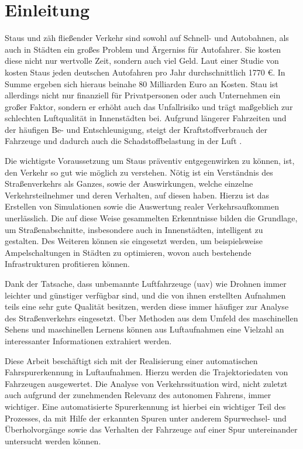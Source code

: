 
\chapter{Einleitung}
\label{cha:introduction}

Staus und zäh fließender Verkehr sind sowohl auf Schnell- und Autobahnen, als auch in Städten ein großes
Problem und Ärgerniss für Autofahrer. Sie kosten diese nicht nur wertvolle Zeit, sondern auch viel Geld.
Laut einer Studie von \cite[]{Cookson} kosten Staus jeden deutschen Autofahren pro Jahr durchschnittlich 1770 €.
In Summe ergeben sich hieraus beinahe 80 Milliarden Euro an Kosten.
Stau ist allerdings nicht nur finanziell für Privatpersonen oder auch Unternehmen ein großer Faktor,
sondern er erhöht auch das Unfallrisiko und trägt maßgeblich zur schlechten Luftqualität in Innenstädten bei.
Aufgrund längerer Fahrzeiten und der häufigen Be- und Entschleunigung, steigt der Kraftstoffverbrauch der
Fahrzeuge und dadurch auch die Schadstoffbelastung in der Luft \cite[]{Hemmerle2016}.

Die wichtigste Voraussetzung um Staus präventiv entgegenwirken zu können, ist, den Verkehr so gut wie
möglich zu verstehen. Nötig ist ein Verständnis des Straßenverkehrs als Ganzes, sowie der Auswirkungen,
welche einzelne Verkehrsteilnehmer und deren Verhalten, auf diesen haben. Hierzu ist das Erstellen von
Simulationen sowie die Auswertung realer Verkehrsaufkommen unerlässlich.
Die auf diese Weise gesammelten Erkenntnisse bilden die Grundlage, um Straßenabschnitte, insbesondere
auch in Innenstädten, intelligent zu gestalten.
Des Weiteren können sie eingesetzt werden, um beispielsweise Ampelschaltungen in Städten zu optimieren,
wovon auch bestehende Infrastrukturen profitieren können.

Dank der Tatsache, dass unbemannte Luftfahrzeuge (\acrshort*{uav}) wie Drohnen immer leichter und günstiger
verfügbar sind, und die von ihnen erstellten Aufnahmen teils eine sehr gute Qualität besitzen, werden
diese immer häufiger zur Analyse des Straßenverkehrs eingesetzt. Über Methoden aus dem Umfeld des
maschinellen Sehens und maschinellen Lernens können aus Luftaufnahmen eine Vielzahl an interessanter
Informationen extrahiert werden.

Diese Arbeit beschäftigt sich mit der Realisierung einer automatischen Fahrspurerkennung in Luftaufnahmen.
Hierzu werden die Trajektoriedaten von Fahrzeugen ausgewertet.
Die Analyse von Verkehrssituation wird, nicht zuletzt auch aufgrund der zunehmenden Relevanz des autonomen
Fahrens, immer wichtiger.
Eine automatisierte Spurerkennung ist hierbei ein wichtiger Teil des Prozesses, da mit Hilfe der
erkannten Spuren unter anderem Spurwechsel- und Überholvorgänge sowie das Verhalten der Fahrzeuge
auf einer Spur untereinander untersucht werden können.

